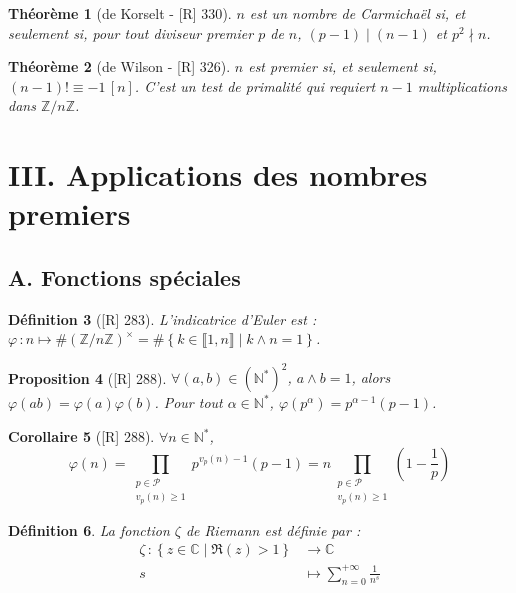\documentclass[10pt, a4paper, parskip=full, twoside, twocolumn]{report}
\newtheorem{definition}{Définition}
\newtheorem{theorem}[definition]{Théorème}
\newtheorem{proposition}[definition]{Proposition}
\newtheorem{corollary}[definition]{Corollaire}
\newcommand{\IN}{\mathbb{N}}
\newcommand{\IZnZ}{\mathbb{Z}/n\mathbb{Z}}
\newcommand{\IC}{\mathbb{C}}
\begin{document}
\begin{theorem}[de Korselt - \textnormal{[R] 330}]
	$n$ est un nombre de Carmichaël si, et seulement si, pour tout diviseur premier $p$ de $n$, $(p-1)\mid(n-1)$ et $p^2\nmid n$.
\end{theorem}

\begin{theorem}[de Wilson - \textnormal{[R] 326}]
	$n$ est premier si, et seulement si, $(n-1)!\equiv -1\,[n]$.
	C'est un test de primalité qui requiert $n-1$ multiplications dans $\IZnZ$.
\end{theorem}

\section*{III. Applications des nombres premiers}
\subsection*{A. Fonctions spéciales}

\begin{definition}[\textnormal{[R] 283}]
	\emph{L'indicatrice d'Euler} est :
	$\varphi\,\colon n \mapsto \#\left(\IZnZ\right)^{\times} = \#\left\{k\in\llbracket 1,n\rrbracket \mid k\wedge n = 1\right\}$.
\end{definition}

\begin{proposition}[\textnormal{[R] 288}]
	$\forall(a,b)\in\left(\IN^*\right)^2$, $a\wedge b=1$, alors $\varphi(ab)=\varphi(a)\varphi(b)$.
	Pour tout $\alpha \in \IN^*$, $\varphi(p^{\alpha}) = p^{\alpha - 1}(p-1)$.
\end{proposition}

\begin{corollary}[\textnormal{[R] 288}]
	$\forall n\in\IN^*$,
	$$\varphi(n) = \prod_{\substack{p\in\mathcal{P}\\v_p(n)\geq 1}} p^{v_p(n)-1}(p-1) = n\prod_{\substack{p\in\mathcal{P}\\v_p(n)\geq 1}} \left(1 - \frac{1}{p}\right)$$	
\end{corollary}

\begin{definition}
	La \emph{fonction $\zeta$ de Riemann} est définie par :
	\begin{align*}
		\zeta\,\colon \left\{z\in\IC\mid \Re(z)> 1\right\} &\to \IC \\
		s &\mapsto \sum_{n=0}^{+\infty} \frac{1}{n^s}
	\end{align*}
\end{definition}
\end{document}
